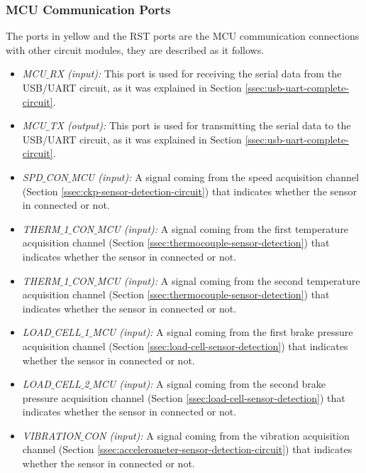 			\subsubsection{MCU Communication Ports}\label{sssec:mcu-com-ports}
				The ports in yellow and the RST ports are the MCU communication connections with other circuit modules, they are described as it follows.

				\begin{itemize}
					\item \textit{MCU$\_$RX (input):} This port is used for receiving the serial data from the USB/UART circuit, as it was explained in Section \ref{ssec:usb-uart-complete-circuit}.\label{itm:mcu-port-mcu-rx}
					\item \textit{MCU$\_$TX (output):} This port is used for transmitting the serial data to the USB/UART circuit, as it was explained in Section \ref{ssec:usb-uart-complete-circuit}.\label{itm:mcu-port-mcu-tx}
					\item \textit{SPD$\_$CON$\_$MCU (input):} A signal coming from the speed acquisition channel (Section \ref{ssec:ckp-sensor-detection-circuit}) that indicates whether the sensor in connected or not.\label{itm:mcu-port-spd-con-mcu}
					\item \textit{THERM$\_$1$\_$CON$\_$MCU (input):} A signal coming from the first temperature acquisition channel (Section \ref{ssec:thermocouple-sensor-detection}) that indicates whether the sensor in connected or not.\label{itm:mcu-port-therm1-con-mcu}
					\item \textit{THERM$\_$1$\_$CON$\_$MCU (input):} A signal coming from the second temperature acquisition channel (Section \ref{ssec:thermocouple-sensor-detection}) that indicates whether the sensor in connected or not.\label{itm:mcu-port-therm2-con-mcu}
					\item \textit{LOAD$\_$CELL$\_$1$\_$MCU (input):} A signal coming from the first brake pressure acquisition channel (Section \ref{ssec:load-cell-sensor-detection}) that indicates whether the sensor in connected or not.\label{itm:mcu-port-load-cell-1-mcu}
					\item \textit{LOAD$\_$CELL$\_$2$\_$MCU (input):} A signal coming from the second brake pressure acquisition channel (Section \ref{ssec:load-cell-sensor-detection}) that indicates whether the sensor in connected or not.\label{itm:mcu-port-load-cell-2-mcu}
					\item \textit{VIBRATION$\_$CON (input):} A signal coming from the vibration acquisition channel (Section \ref{ssec:accelerometer-sensor-detection-circuit}) that indicates whether the sensor in connected or not.\label{itm:mcu-port-vibration-con}

\end{itemize}
